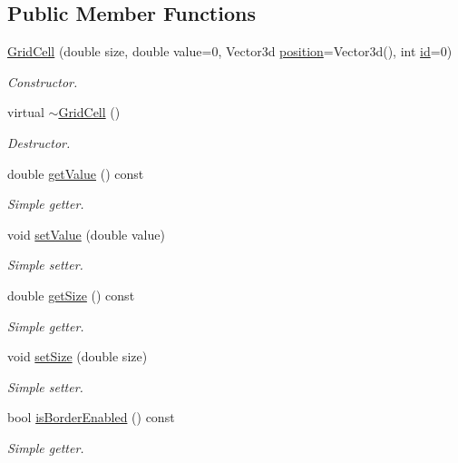 \subsection*{Public Member Functions}
\begin{DoxyCompactItemize}
\item 
\hyperlink{classGridCell_aefc88a474d5b3e60c3c5ae919c7e1bf9}{Grid\+Cell} (double size, double value=0, Vector3d \hyperlink{classLocalizedObject_a340834deefc9e5c39da1f26c4ebf4f8c}{position}=Vector3d(), int \hyperlink{classIdentifiedObject_ad044a317a9b573a3d1bcd025df166eb5}{id}=0)
\begin{DoxyCompactList}\small\item\em Constructor. \end{DoxyCompactList}\item 
virtual \hyperlink{classGridCell_a8952d31ed1dd16eb5fb32fff9be95c7c}{$\sim$\+Grid\+Cell} ()
\begin{DoxyCompactList}\small\item\em Destructor. \end{DoxyCompactList}\item 
double \hyperlink{classGridCell_a04f6b968f8a878747f196c582288f2e9}{get\+Value} () const 
\begin{DoxyCompactList}\small\item\em Simple getter. \end{DoxyCompactList}\item 
void \hyperlink{classGridCell_a450cb7b243e81d70583f24ae0902568d}{set\+Value} (double value)
\begin{DoxyCompactList}\small\item\em Simple setter. \end{DoxyCompactList}\item 
double \hyperlink{classGridCell_a4d2ec9a305c1e5a3508420f2b75e0721}{get\+Size} () const 
\begin{DoxyCompactList}\small\item\em Simple getter. \end{DoxyCompactList}\item 
void \hyperlink{classGridCell_a10b03ef94c1fbc4145692c846c14809c}{set\+Size} (double size)
\begin{DoxyCompactList}\small\item\em Simple setter. \end{DoxyCompactList}\item 
bool \hyperlink{classGridCell_acc9dad8cc0fbf272a4df442329cfff89}{is\+Border\+Enabled} () const 
\begin{DoxyCompactList}\small\item\em Simple getter. \end{DoxyCompactList}\item 

\end{DoxyCompactItemize}
